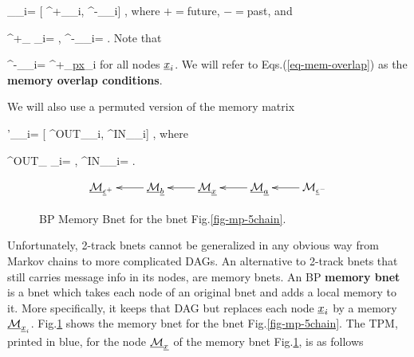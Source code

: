 \beq
\calm_{\rvx_i}=
[
\calm^+_{\rvx_i},
\calm^-_{\rvx_i}]
\;,
\eeq
where $+=$future, $-=$past, and 

\beq
\calm^+_{ \rvx_i}=
\;, 
\;\;\;
\calm^-_{\rvx_i}=
\;.
\eeq 
Note that

\beq
\calm^-_{\rvx_i}=
\calm^+_{\ul{px}_i}
\label{eq-mem-overlap}
\eeq
for all nodes ${\underline{x}}_i$.
We will refer to
Eqs.(\ref{eq-mem-overlap}) as
the {\bf memory overlap
conditions}.

We will also use a permuted version of the 
memory matrix

\beq
\calm'_{\rvx_i}=
[
\calm^{OUT}_{\rvx_i},
\calm^{IN}_{\rvx_i}]
\;,
\eeq
where

\beq
\calm^{OUT}_{ \rvx_i}=
\;, 
\;\;\;
\calm^{IN}_{\rvx_i}=
\;.
\eeq

\begin{figure}[h!]
$$\xymatrix{
\ucalm_{\rveps^+}
&
\ucalm_\rvb\ar[l]
&
\ucalm_\rvx\ar[l]
&
\ucalm_\rva\ar[l]
&
\calm_{\rveps^-}\ar[l]
}$$
\caption{BP Memory Bnet for the bnet
Fig.\ref{fig-mp-5chain}. }
\label{fig-mem-5chain}
\end{figure}

Unfortunately,
2-track bnets cannot be
 generalized in any
obvious way  from 
Markov chains to more
complicated DAGs.
An alternative to 2-track bnets
that still
carries message
info in its nodes,
are memory bnets. An BP
{\bf memory bnet}
is a bnet 
which takes each node
of an original
bnet and
adds a local memory to it.
More specifically,
it keeps that DAG
but replaces each node
${\underline{x}}_i$
by a memory $\underline{{\cal M}}_{{\underline{x}}_i}$.
Fig.\ref{fig-mem-5chain} shows 
the memory bnet for
the bnet Fig.\ref{fig-mp-5chain}.
The TPM, printed in blue,
for the  node $\underline{{\cal M}}_{\underline{x}}$
of the memory bnet 
Fig.\ref{fig-mem-5chain}, is as follows

